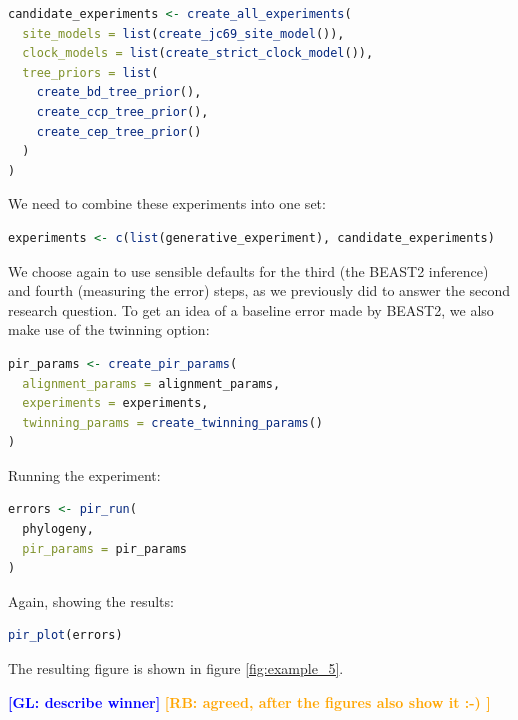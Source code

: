 \documentclass{article}
\newcommand{\giovanni}[1]{\textcolor{blue}{\textbf{[GL: #1]}}}
\newcommand{\richel}[1]{\textcolor{orange}{\textbf{[RB: #1]}}}
\begin{document}
\begin{lstlisting}[language=R, floatplacement=H, frame=single]
candidate_experiments <- create_all_experiments(
  site_models = list(create_jc69_site_model()),
  clock_models = list(create_strict_clock_model()),
  tree_priors = list(
    create_bd_tree_prior(), 
    create_ccp_tree_prior(), 
    create_cep_tree_prior()
  )
)
\end{lstlisting}

We need to combine these experiments into one set:

\begin{lstlisting}[language=R, floatplacement=H, frame=single]
experiments <- c(list(generative_experiment), candidate_experiments)
\end{lstlisting}

We choose again to use sensible defaults for the third (the BEAST2 inference) and fourth (measuring the error) steps, as we previously did to answer the second research question. To get an idea of a baseline error made by BEAST2, we also make use of the twinning option:

\begin{lstlisting}[language=R, floatplacement=H, frame=single]
pir_params <- create_pir_params(
  alignment_params = alignment_params,
  experiments = experiments,
  twinning_params = create_twinning_params()
)
\end{lstlisting}

Running the experiment:

\begin{lstlisting}[language=R, floatplacement=H, frame=single]
errors <- pir_run(
  phylogeny,
  pir_params = pir_params
)
\end{lstlisting}

Again, showing the results:

\begin{lstlisting}[language=R, floatplacement=H, frame=single]
pir_plot(errors)
\end{lstlisting}

The resulting figure is shown in figure \ref{fig:example_5}.

\giovanni{describe winner}
\richel{agreed, after the figures also show it :-) }
\end{document}
